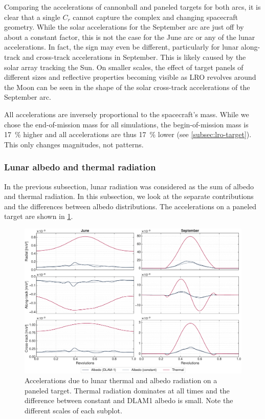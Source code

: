 Comparing the accelerations of cannonball and paneled targets for both arcs, it is clear that a single $C_r$ cannot capture the complex and changing spacecraft geometry. While the solar accelerations for the September arc are just off by about a constant factor, this is not the case for the June arc or any of the lunar accelerations. In fact, the sign may even be different, particularly for lunar along-track and cross-track accelerations in September. This is likely caused by the solar array tracking the Sun. On smaller scales, the effect of target panels of different sizes and reflective properties becoming visible as \gls{LRO} revolves around the Moon can be seen in the shape of the solar cross-track accelerations of the September arc.

All accelerations are inversely proportional to the spacecraft's mass. While we chose the end-of-mission mass for all simulations, the begin-of-mission mass is \qty{17}{\percent} higher and all accelerations are thus \qty{17}{\percent} lower (see \cref{subsec:lro-target}). This only changes magnitudes, not patterns.





\subsubsection{Lunar albedo and thermal radiation}
In the previous subsection, lunar radiation was considered as the sum of albedo and thermal radiation. In this subsection, we look at the separate contributions and the differences between albedo distributions. The accelerations on a paneled target are shown in \cref{fig:acc-albedovsthermal}.

\begin{figure}[t]
    \centering
    \includegraphics[width=\textwidth]{figures/plots/acc_albedovsthermal.pdf}

    \caption{Accelerations due to lunar thermal and albedo radiation on a paneled target. Thermal radiation dominates at all times and the difference between constant and \gls{DLAM1} albedo is small. Note the different scales of each subplot.}
    \label{fig:acc-albedovsthermal}
\end{figure}

